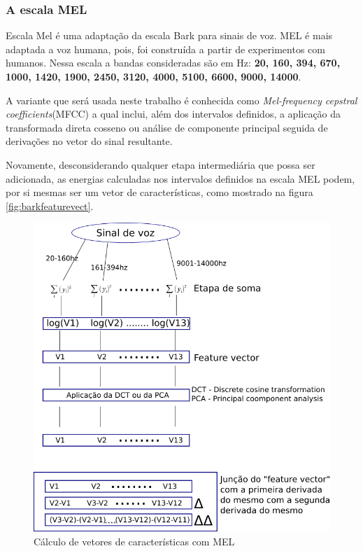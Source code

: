 	\subsubsection{A escala MEL}
		\par Escala Mel é uma adaptação da escala Bark para sinais de voz. MEL é mais adaptada a voz humana, pois, foi construída a partir de experimentos com humanos. Nessa escala a bandas consideradas são em Hz: \textbf{20, 160, 394, 670, 1000, 1420, 1900, 2450, 3120, 4000, 5100, 6600, 9000, 14000}.
		\par A variante que será usada neste trabalho é conhecida como \textit{Mel-frequency cepstral coefficients}(MFCC) a qual inclui, além dos intervalos definidos, a aplicação da transformada direta cosseno ou  análise de componente principal seguida de derivações no vetor do sinal resultante.
		\par Novamente, desconsiderando qualquer etapa intermediária que possa ser adicionada, as energias calculadas nos intervalos definidos na escala MEL podem, por si mesmas ser um vetor de características, como mostrado na figura \ref{fig:barkfeaturevect}.
		\begin{figure}[h]
			\centering
			\includegraphics[width=0.6\linewidth]{images/melFeatureVect}
			\caption{Cálculo de vetores de características com MEL}
			\label{fig:melfeaturevect}
		\end{figure}
			
